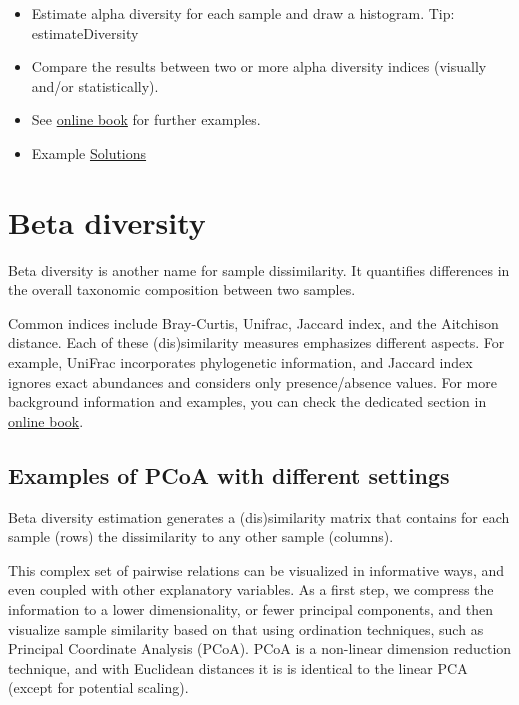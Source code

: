 \documentclass[
]{book}
\begin{document}
\begin{itemize}
\item
  Estimate alpha diversity for each sample and draw a histogram. Tip:
  estimateDiversity
\item
  Compare the results between two or more
  alpha diversity indices (visually and/or statistically).
\item
  See \href{https://microbiome.github.io/OMA/microbiome-diversity.html\#alpha-diversity}{online book}
  for further examples.
\item
  Example \href{07-3-ex-sol-ADHD.html}{Solutions}
\end{itemize}

\hypertarget{beta-diversity}{%
\chapter{Beta diversity}\label{beta-diversity}}

Beta diversity is another name for sample dissimilarity. It quantifies
differences in the overall taxonomic composition between two samples.

Common indices include Bray-Curtis, Unifrac, Jaccard index, and the
Aitchison distance. Each of these (dis)similarity measures emphasizes
different aspects. For example, UniFrac incorporates phylogenetic
information, and Jaccard index ignores exact abundances and considers
only presence/absence values. For more background information
and examples, you can check the dedicated section in \href{https://microbiome.github.io/OMA/microbiome-diversity.html\#beta-diversity}{online
book}.

\hypertarget{examples-of-pcoa-with-different-settings}{%
\section{Examples of PCoA with different settings}\label{examples-of-pcoa-with-different-settings}}

Beta diversity estimation generates a (dis)similarity matrix that
contains for each sample (rows) the dissimilarity to any other sample
(columns).

This complex set of pairwise relations can be visualized in
informative ways, and even coupled with other explanatory
variables. As a first step, we compress the information to a lower
dimensionality, or fewer principal components, and then visualize
sample similarity based on that using ordination techniques, such as
Principal Coordinate Analysis (PCoA). PCoA is a non-linear dimension
reduction technique, and with Euclidean distances it is is identical
to the linear PCA (except for potential scaling).
\end{document}
